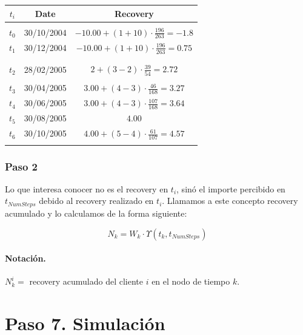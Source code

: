 \begin{minipage}[c]{0.6\columnwidth}%
\centering
\begin{tabular}{c|c|c}
\textbf{$t_i$} & \textbf{Date}  & \textbf{Recovery} \\
\hline
      &            &      \\
$t_0$ & 30/10/2004 & $-10.00 + (1+10) \cdot \frac{196}{263} =  -1.8$\\
$t_1$ & 30/12/2004 & $-10.00 + (1+10) \cdot \frac{196}{263} =  0.75$ \\
      &            &      \\
      &            &      \\
$t_2$ & 28/02/2005 & $2 + (3-2) \cdot \frac{39}{54} = 2.72$ \\
      &            &      \\
$t_3$ & 30/04/2005 & $3.00 + (4-3) \cdot \frac{46}{168} = 3.27$ \\
$t_4$ & 30/06/2005 & $3.00 + (4-3) \cdot \frac{107}{168} = 3.64$ \\
$t_5$ & 30/08/2005 & $4.00$ \\
$t_6$ & 30/10/2005 & $4.00 + (5-4) \cdot \frac{61}{107} = 4.57$ \\
      &            &      \\
\end{tabular}
\end{minipage}%

\subsubsection{Paso 2}

Lo que interesa conocer no es el recovery en $t_i$, sin\'o el importe
percibido en $t_{NumSteps}$ debido al recovery realizado en $t_i$.
Llamamos a este concepto recovery acumulado y lo calculamos de la
forma siguiente:

\begin{displaymath}
N_k =  W_k \cdot \Upsilon(t_k,t_{NumSteps})
\end{displaymath}

\paragraph{Notaci\'on.} $N_k^i =$ recovery acumulado del cliente $i$ en el
nodo de tiempo $k$.


\section{Paso 7. Simulaci\'on}

